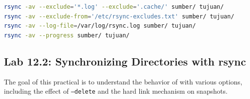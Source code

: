 \begin{lstlisting}[language=bash, caption={Frequently used rsync options}]
rsync -av --exclude='*.log' --exclude='.cache/' sumber/ tujuan/
rsync -av --exclude-from='/etc/rsync-excludes.txt' sumber/ tujuan/
rsync -av --log-file=/var/log/rsync.log sumber/ tujuan/
rsync -av --progress sumber/ tujuan/
\end{lstlisting}

\subsection*{Lab 12.2: Synchronizing Directories with rsync}

The goal of this practical is to understand the behavior of  with various options, including the effect of \texttt{--delete} and the hard link mechanism on snapshots.

